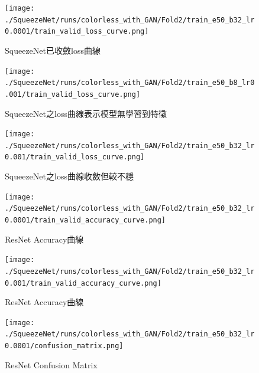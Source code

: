 \begin{figure}[htbp]
    \centering
    \texttt{[image: ./SqueezeNet/runs/colorless\_with\_GAN/Fold2/train\_e50\_b32\_lr0.0001/train\_valid\_loss\_curve.png]}
    \caption{SqueezeNet已收斂loss曲線}
    \label{fig:SqueezeNet_convergence_loss_curve}
\end{figure}
\begin{figure}[htbp]
    \centering
    \texttt{[image: ./SqueezeNet/runs/colorless\_with\_GAN/Fold2/train\_e50\_b8\_lr0.001/train\_valid\_loss\_curve.png]}
    \caption{SqueezeNet之loss曲線表示模型無學習到特徵}
    \label{fig:SqueezeNet_unconvergence_loss_curve}
\end{figure}
\begin{figure}[htbp]
    \centering
    \texttt{[image: ./SqueezeNet/runs/colorless\_with\_GAN/Fold2/train\_e50\_b32\_lr0.001/train\_valid\_loss\_curve.png]}
    \caption{SqueezeNet之loss曲線收斂但較不穩}
    \label{fig:SqueezeNet_unconvergence_loss_curve_1e-3}
\end{figure}
\begin{figure}[htbp]
    \centering
    \texttt{[image: ./SqueezeNet/runs/colorless\_with\_GAN/Fold2/train\_e50\_b32\_lr0.0001/train\_valid\_accuracy\_curve.png]}
    \caption{ResNet Accuracy曲線}
    \label{fig:SqueezeNet_accuracy_curve_0.96}
\end{figure}
\begin{figure}[htbp]
    \centering
    \texttt{[image: ./SqueezeNet/runs/colorless\_with\_GAN/Fold2/train\_e50\_b32\_lr0.001/train\_valid\_accuracy\_curve.png]}
    \caption{ResNet Accuracy曲線}
    \label{fig:SqueezeNet_accuracy_curve_0.69}
\end{figure}
\begin{figure}[htbp]
    \centering
    \texttt{[image: ./SqueezeNet/runs/colorless\_with\_GAN/Fold2/train\_e50\_b32\_lr0.0001/confusion\_matrix.png]}
    \caption{ResNet Confusion Matrix}
    \label{fig:SqueezeNet_confuson_matrix}
\end{figure}
%
